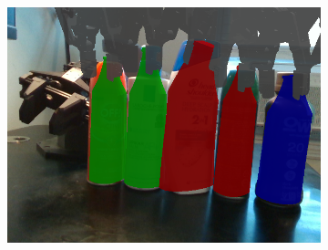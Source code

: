 \documentclass{article}
\begin{document}
\begin{figure}[]
\begin{subfigure}{(\linewidth - 0.05\linewidth)/5}
        \includegraphics[width=\linewidth]{figures/real2sim2real/4/4.png}
    \end{subfigure}


\end{figure}
\end{document}
